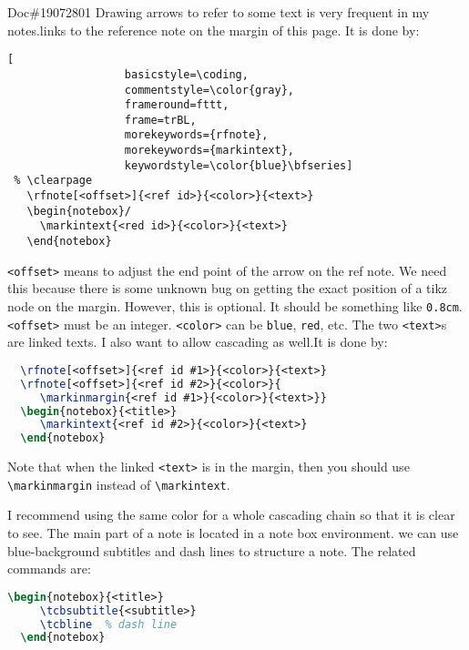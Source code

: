 \documentclass{flownotes}
\begin{document}
\clearpage
{}
\begin{notebox}{Doc\#19072801}
Drawing arrows to refer to some text is very frequent in my notes.links to the reference note on the margin of this page. It is done by:
{
\begin{lstlisting}[
                  basicstyle=\coding,
                  commentstyle=\color{gray},
                  frameround=fttt,
                  frame=trBL,
                  morekeywords={rfnote},
                  morekeywords={markintext},
                  keywordstyle=\color{blue}\bfseries]
 % \clearpage
   \rfnote[<offset>]{<ref id>}{<color>}{<text>}
   \begin{notebox}/
     \markintext{<red id>}{<color>}{<text>}
   \end{notebox}
\end{lstlisting}}
\texttt{<offset>} means to adjust the end point of the arrow on the ref note. We need this because there is some unknown bug on getting the exact position of a tikz node on the margin. However, this is optional. It should be something like \texttt{0.8cm}. \texttt{<offset>} must be an integer. \texttt{<color>} can be \texttt{blue}, \texttt{red}, etc. The two \texttt{<text>}s are linked texts.
\tcbline
I also want to allow cascading as well.It is done by:
\begin{lstlisting}[language=TeX,
                  basicstyle=\coding,
                  commentstyle=\color{gray}]
  % \clearpage
  \rfnote[<offset>]{<ref id #1>}{<color>}{<text>}
  \rfnote[<offset>]{<ref id #2>}{<color>}{
     \markinmargin{<ref id #1>}{<color>}{<text>}}
  \begin{notebox}{<title>}
     \markintext{<ref id #2>}{<color>}{<text>}
  \end{notebox}
\end{lstlisting}
Note that when the linked \texttt{<text>} is in the margin, then you should use \texttt{\textbackslash markinmargin} instead of \texttt{\textbackslash markintext}.

I recommend using the same color for a whole cascading chain so that it is clear to see.
The main part of a note is located in a note box environment. we can use blue-background subtitles and dash lines to structure a note. The related commands are:
\begin{lstlisting}[language=TeX,
                  basicstyle=\coding,
                  commentstyle=\color{gray}]
  \begin{notebox}{<title>}
     \tcbsubtitle{<subtitle>}
     \tcbline  % dash line
  \end{notebox}
\end{lstlisting}
\end{notebox}
\end{document}
